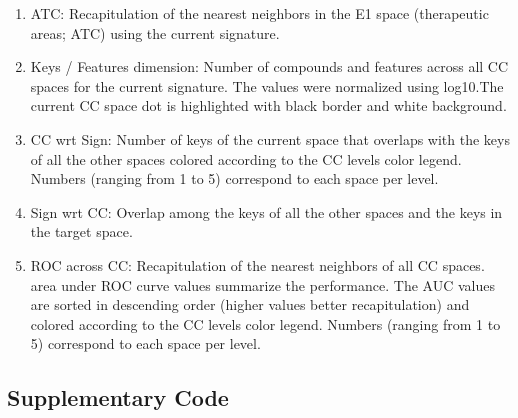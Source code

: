 \begin{enumerate}
    \item[\textbullet]ATC: Recapitulation of the nearest neighbors in the E1 space (therapeutic areas; ATC) using the current signature. 
    \item[\textbullet]Keys / Features dimension: Number of compounds and features across all CC spaces for the current signature. The values were normalized using log10.The current CC space dot is highlighted with black border and white background.
    \item[\textbullet]CC wrt Sign: Number of keys of the current space that overlaps with the keys of all the other spaces colored according to the CC levels color legend. Numbers (ranging from 1 to 5) correspond to each space per level.
    \item[\textbullet]Sign wrt CC:  Overlap among the keys of all the other spaces and the keys in the target space.
    \item[\textbullet]ROC across CC: Recapitulation of the nearest neighbors of all CC spaces. area under ROC curve values summarize the performance. The AUC values are sorted in descending order (higher values better recapitulation) and colored according to the CC levels color legend. Numbers (ranging from 1 to 5) correspond to each space per level.
\end{enumerate}


\subsection{Supplementary Code}

